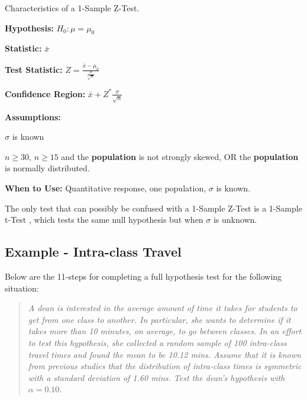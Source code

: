 \documentclass[10pt,openany]{book}\usepackage[]{graphicx}\usepackage[]{color}
\begin{document}
\vspace*{-3pt}
\begin{table}[h]
\centering
\colorbox{ltgray}{
\begin{minipage}{.75\textwidth}
  \centering
	\caption{Characteristics of a 1-Sample Z-Test.}\label{tab:1Zspec}
  \begin{Itemize}
  \vspace*{-6pt}
      \item \textbf{Hypothesis:} $H_{0}:\mu=\mu_{0}$
      \item \textbf{Statistic:} $\bar{x}$
      \vspace{4pt}
      \item \textbf{Test Statistic:} $Z=\frac{\bar{x}-\mu_{0}}{\frac{\sigma}{\sqrt{n}}}$
      \vspace{4pt}
      \item \textbf{Confidence Region:} $\bar{x}+Z^{*}\frac{\sigma}{\sqrt{n}}$
      \vspace{4pt}
      \item \textbf{Assumptions:}
        \begin{Enumerate}
          \item $\sigma$ is known
          \item $n\geq30$, $n\geq15$ and the \textbf{population} is not strongly skewed, OR the \textbf{population} is normally distributed.
        \end{Enumerate}
      \item \textbf{When to Use:} Quantitative response, one population, $\sigma$ is known.
  \end{Itemize}
\end{minipage}}
\end{table}
\vspace*{-3pt}

The only test that can possibly be confused with a 1-Sample Z-Test is a 1-Sample t-Test , which tests the same null hypothesis but when $\sigma$ is unknown.

\vspace*{-4pt}
\subsection{Example - Intra-class Travel}
\vspace{-2pt}
Below are the 11-steps  for completing a full hypothesis test for the following situation:
\vspace{-4pt}
\begin{quote}
\textsl{A dean is interested in the average amount of time it takes for students to get from one class to another. In particular, she wants to determine if it takes more than 10 minutes, on average, to go between classes. In an effort to test this hypothesis, she collected a random sample of 100 intra-class travel times and found the mean to be 10.12 mins. Assume that it is known from previous studies that the distribution of intra-class times is symmetric with a standard deviation of 1.60 mins. Test the dean's hypothesis with $\alpha=0.10$.}
\end{quote}
\end{document}
